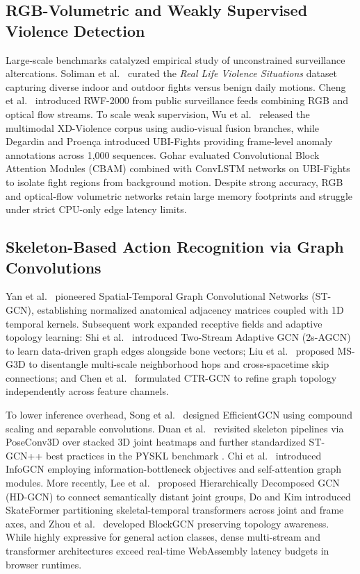 \documentclass[conference]{IEEEtran}
\begin{document}
\subsection{RGB-Volumetric and Weakly Supervised Violence Detection}
Large-scale benchmarks catalyzed empirical study of unconstrained surveillance altercations. Soliman et al.~\cite{b5} curated the \textit{Real Life Violence Situations} dataset capturing diverse indoor and outdoor fights versus benign daily motions. Cheng et al.~\cite{b6} introduced RWF-2000 from public surveillance feeds combining RGB and optical flow streams. To scale weak supervision, Wu et al.~\cite{b7} released the multimodal XD-Violence corpus using audio-visual fusion branches, while Degardin and Proen\c{c}a \cite{b8} introduced UBI-Fights providing frame-level anomaly annotations across 1,000 sequences. Gohar \cite{b9} evaluated Convolutional Block Attention Modules (CBAM) combined with ConvLSTM networks on UBI-Fights to isolate fight regions from background motion. Despite strong accuracy, RGB and optical-flow volumetric networks retain large memory footprints and struggle under strict CPU-only edge latency limits.

\subsection{Skeleton-Based Action Recognition via Graph Convolutions}
Yan et al.~\cite{b2} pioneered Spatial-Temporal Graph Convolutional Networks (ST-GCN), establishing normalized anatomical adjacency matrices coupled with 1D temporal kernels. Subsequent work expanded receptive fields and adaptive topology learning: Shi et al.~\cite{b10} introduced Two-Stream Adaptive GCN (2s-AGCN) to learn data-driven graph edges alongside bone vectors; Liu et al.~\cite{b11} proposed MS-G3D to disentangle multi-scale neighborhood hops and cross-spacetime skip connections; and Chen et al.~\cite{b12} formulated CTR-GCN to refine graph topology independently across feature channels.

To lower inference overhead, Song et al.~\cite{b13} designed EfficientGCN using compound scaling and separable convolutions. Duan et al.~\cite{b14} revisited skeleton pipelines via PoseConv3D over stacked 3D joint heatmaps and further standardized ST-GCN++ best practices in the PYSKL benchmark \cite{b15}. Chi et al.~\cite{b16} introduced InfoGCN employing information-bottleneck objectives and self-attention graph modules. More recently, Lee et al.~\cite{b17} proposed Hierarchically Decomposed GCN (HD-GCN) to connect semantically distant joint groups, Do and Kim \cite{b18} introduced SkateFormer partitioning skeletal-temporal transformers across joint and frame axes, and Zhou et al.~\cite{b19} developed BlockGCN preserving topology awareness. While highly expressive for general action classes, dense multi-stream and transformer architectures exceed real-time WebAssembly latency budgets in browser runtimes.
\end{document}
